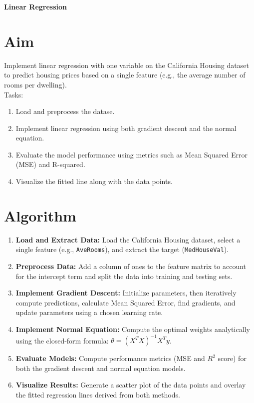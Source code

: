 \documentclass[12pt, a4paper]{report}
\begin{document}
\label{exp:1}
\begin{center}
{\bfseries \Huge Linear Regression}	
\end{center}


\section*{Aim}
Implement linear regression with one variable on the California Housing dataset to predict housing prices based on a single feature (e.g., the average number of rooms per dwelling).  \\
Tasks:
\begin{enumerate}[\quad -]
\itemsep 0em 

\item Load and preprocess the datase.
\item Implement linear regression using both gradient descent and the normal equation.
\item Evaluate the model performance using metrics such as Mean Squared Error (MSE) and R-squared.
\item Visualize the fitted line along with the data points.
\end{enumerate}

\section*{Algorithm} 

\begin{enumerate}
	\itemsep 0em
	\item \textbf{Load and Extract Data:} Load the California Housing dataset, select a single feature (e.g., \texttt{AveRooms}), and extract the target (\texttt{MedHouseVal}).
	\item \textbf{Preprocess Data:} Add a column of ones to the feature matrix to account for the intercept term and split the data into training and testing sets.
	\item \textbf{Implement Gradient Descent:} Initialize parameters, then iteratively compute predictions, calculate Mean Squared Error, find gradients, and update parameters using a chosen learning rate.
	\item \textbf{Implement Normal Equation:} Compute the optimal weights analytically using the closed-form formula: $\theta = (X^T X)^{-1} X^T y$.
	\item \textbf{Evaluate Models:} Compute performance metrics (MSE and $R^2$ score) for both the gradient descent and normal equation models.
	\item \textbf{Visualize Results:} Generate a scatter plot of the data points and overlay the fitted regression lines derived from both methods.
\end{enumerate}
\end{document}
